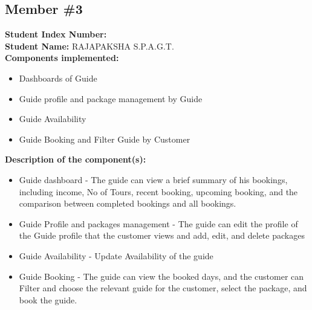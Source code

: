 \subsection{Member \#3}
\textbf{Student Index Number: } \\
\textbf{Student Name: } RAJAPAKSHA S.P.A.G.T.\\
\textbf{Components implemented:} 
\begin{itemize}
    \item Dashboards of Guide
    \item Guide profile and package management by Guide
    \item Guide Availability
    \item Guide Booking and Filter Guide by Customer
\end{itemize}
\textbf{Description of the component(s):}
\begin{itemize}
    \item Guide dashboard - The guide can view a brief summary of his bookings, including income, No of Tours, recent booking, upcoming booking, and the comparison between completed bookings and all bookings.
    \item Guide Profile and packages management - The guide can edit the profile of the Guide profile that the customer views and add, edit, and delete packages
    \item Guide Availability - Update Availability of the guide
    \item Guide Booking - The guide can view the booked days, and the customer can Filter and choose the relevant guide for the customer, select the package, and book the guide.
\end{itemize}







